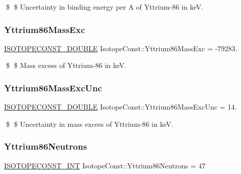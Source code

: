 \$ \$ Uncertainty in binding energy per A of Yttrium-\/86 in keV. \mbox{\label{group___isotope_const-_yttrium-_y86_ga135fe4325bc703a9264024a281bf4b3d}} 
\subsubsection{\texorpdfstring{Yttrium86\+Mass\+Exc}{Yttrium86MassExc}}
{\footnotesize\ttfamily \mbox{\hyperlink{group___isotope_const-_macros_ga8f45a7272ce02c0b4c65c44636ed719a}{I\+S\+O\+T\+O\+P\+E\+C\+O\+N\+S\+T\+\_\+\+D\+O\+U\+B\+LE}} Isotope\+Const\+::\+Yttrium86\+Mass\+Exc = -\/79283.}

\$ \$ Mass excess of Yttrium-\/86 in keV. \mbox{\label{group___isotope_const-_yttrium-_y86_gabe75a7c84a202794952540f11a058a21}} 
\subsubsection{\texorpdfstring{Yttrium86\+Mass\+Exc\+Unc}{Yttrium86MassExcUnc}}
{\footnotesize\ttfamily \mbox{\hyperlink{group___isotope_const-_macros_ga8f45a7272ce02c0b4c65c44636ed719a}{I\+S\+O\+T\+O\+P\+E\+C\+O\+N\+S\+T\+\_\+\+D\+O\+U\+B\+LE}} Isotope\+Const\+::\+Yttrium86\+Mass\+Exc\+Unc = 14.}

\$ \$ Uncertainty in mass excess of Yttrium-\/86 in keV. \mbox{\label{group___isotope_const-_yttrium-_y86_ga85bb6ed918f0727a1d8cf16750375561}} 
\subsubsection{\texorpdfstring{Yttrium86\+Neutrons}{Yttrium86Neutrons}}
{\footnotesize\ttfamily \mbox{\hyperlink{group___isotope_const-_macros_ga5f18360b3e99483a35c32d789e62621c}{I\+S\+O\+T\+O\+P\+E\+C\+O\+N\+S\+T\+\_\+\+I\+NT}} Isotope\+Const\+::\+Yttrium86\+Neutrons = 47}

